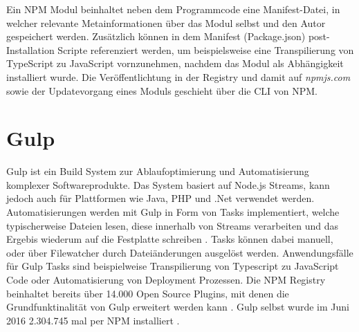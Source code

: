 Ein \ac{NPM} Modul beinhaltet neben dem Programmcode eine Manifest-Datei, in welcher relevante Metainformationen über das Modul selbst und den Autor gespeichert werden.
Zusätzlich können in dem Manifest (Package.json) post-Installation Scripte referenziert werden, um
beispielsweise eine Transpilierung von TypeScript zu JavaScript vornzunehmen, nachdem das Modul als Abhängigkeit installiert wurde.
Die Veröffentlichtung in der Registry und damit auf \emph{npmjs.com} sowie der Updatevorgang eines Moduls geschieht über die \ac{CLI} von \ac{NPM}.

\section{Gulp}

Gulp ist ein Build System zur Ablaufoptimierung und Automatisierung komplexer Softwareprodukte.
Das System basiert auf Node.js Streams, kann jedoch auch für Plattformen wie Java, PHP und .Net verwendet werden.
Automatisierungen werden mit Gulp in Form von Tasks implementiert,
welche typischerweise Dateien lesen, diese innerhalb von Streams verarbeiten und das Ergebis wiederum auf die
Festplatte schreiben \cite{gulpj46:online}.
Tasks können dabei manuell, oder über Filewatcher durch Dateiänderungen ausgelöst werden.
Anwendungsfälle für Gulp Tasks sind beispielweise Transpilierung von Typescript zu JavaScript Code oder
Automatisierung von Deployment Prozessen. Die \ac{NPM} Registry beinhaltet bereits über 14.000 Open Source Plugins,
mit denen die Grundfunktinalität von Gulp erweitert werden kann \cite{resul14:online}.
Gulp selbst wurde im Juni 2016 2.304.745 mal per NPM installiert \cite{gulp17:online}.

